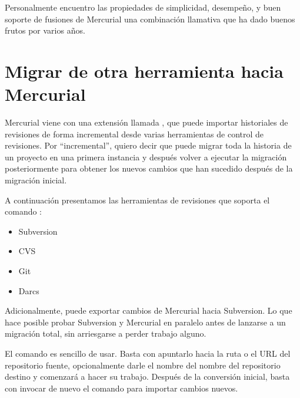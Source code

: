Personalmente encuentro las propiedades de simplicidad, desempeño, y
buen soporte de fusiones de Mercurial una combinación llamativa que ha
dado buenos frutos por varios años.


\section{Migrar de otra herramienta hacia Mercurial}

Mercurial viene con una extensión llamada , que puede
importar historiales de revisiones de forma incremental desde varias
herramientas de control de revisiones. Por ``incremental'', quiero
decir que puede migrar toda la historia de un proyecto en una primera
instancia y después volver a ejecutar la migración posteriormente para
obtener los nuevos cambios que han sucedido después de la migración
inicial.

A continuación presentamos las herramientas de revisiones que soporta
el comando :
\begin{itemize}
\item Subversion
\item CVS
\item Git
\item Darcs
\end{itemize}

Adicionalmente,  puede exportar cambios de Mercurial
hacia Subversion.  Lo que hace posible probar Subversion y Mercurial
en paralelo antes de lanzarse a un migración total, sin arriesgarse a
perder trabajo alguno.

El comando  es sencillo de usar. Basta con
apuntarlo hacia la ruta o el URL del repositorio fuente, opcionalmente
darle el nombre del nombre del repositorio destino y comenzará a hacer
su trabajo. Después de la conversión inicial, basta con invocar de
nuevo el comando para importar cambios nuevos.


